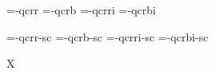

\ifx\sizespec\undefined \def\sizespec{}\fi
\ifx\font\corkencoded {}\else {}\fi

\font\tenrm=\tmp-qcrr  \sizespec
\font\tenbf=\tmp-qcrb  \sizespec
\font\tenit=\tmp-qcrri \sizespec
\font\tenbi=\tmp-qcrbi \sizespec

\font\tenrmc=\tmp-qcrr-sc  \sizespec
\font\tenbfc=\tmp-qcrb-sc  \sizespec
\font\tenitc=\tmp-qcrri-sc \sizespec
\font\tenbic=\tmp-qcrbi-sc \sizespec

\tenrm

\ifx\regfontdefault\undefined \else
   \regfontdefault
   \regfont\tenrmc \regfont\tenitc
   \regfont\tenbfc \regfont\tenbic
\fi

\def\caps#1{{\escapechar=-1 \expandafter}%
  \expandafter\csname\expandafter\tenonlytext\string#1c\endcsname}
\def\tenonlytext{ten}

\ifx\font\corkencoded\else \ifx\font\unicoded\else  \fi\fi
\ifx\mathpreloaded X\else  \fi                     



